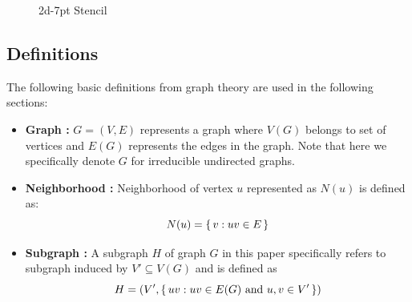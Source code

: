 \begin{figure}[tbhp]
	\centering
	\hspace{1.5em}
	\caption{2d-7pt Stencil}
	\label{fig:2d-7pt}
\end{figure}

\subsection*{Definitions}
The following basic definitions from graph theory are used in the following sections:
\begin{itemize}
	\item \textbf{Graph : } $G = (V,E)$ represents a graph where $V(G)$ belongs to set of vertices and $E(G)$ represents the edges in the graph. Note that here we specifically denote $G$ for irreducible undirected graphs.
	\item \textbf{Neighborhood :} Neighborhood of vertex $u$ represented as $N(u)$ is defined as:
	\begin{equation*}
	  N(u) = \set{ v : uv \in E}
	\end{equation*}
	\item \textbf{Subgraph :} A subgraph $H$ of graph $G$ in this paper specifically refers to subgraph induced by $V' \subseteq V(G)$ and is defined as
	\begin{equation*}
		H = (V', \set{ uv : uv \in E(G) \text{ and } u,v \in V'})
	\end{equation*}
\end{itemize}

